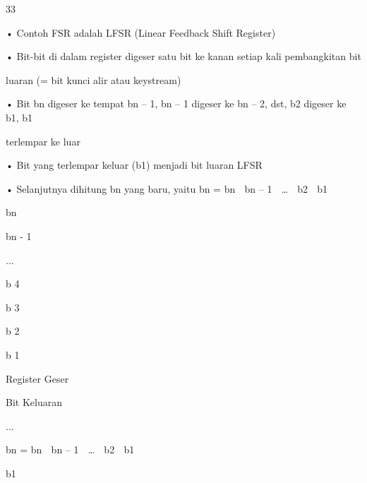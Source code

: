 \documentclass{article}
\begin{document}

33

• Contoh FSR adalah LFSR (Linear Feedback Shift Register) 

• Bit-bit di dalam register digeser satu bit ke kanan setiap kali pembangkitan bit 

luaran (= bit kunci alir atau keystream)

• Bit bn digeser ke tempat bn – 1, bn – 1 digeser ke bn – 2, dst, b2 digeser ke b1, b1 

terlempar ke luar

• Bit yang terlempar keluar (b1) menjadi bit luaran LFSR

• Selanjutnya dihitung bn yang baru, yaitu  bn  = bn  bn – 1  …  b2  b1

bn

bn - 1

...

b 4

b 3

b 2

b 1

Register Geser

Bit Keluaran

...

bn  = bn  bn – 1  …  b2  b1

b1
\end{document}
